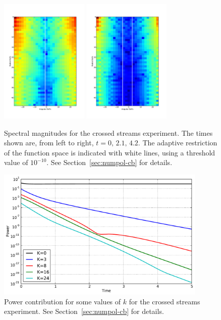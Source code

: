 \begin{figure}
{    \includegraphics[width=4.2cm]{figs/polboltz/scrossed-spec-b2-i1}
    \includegraphics[width=4.2cm]{figs/polboltz/scrossed-spec-b2-i2}
}
\caption{Spectral magnitudes for the crossed streams experiment.  The times shown are, from left to right,
$t=0,\,2.1,\,4.2$.  The adaptive restriction of the function space is indicated with white lines,
using a threshold value of $10^{-10}$. See Section~\vref{sec:numpol-cb} for details.}
\label{fig:numpol-cb-spec}
\end{figure}

\begin{figure}
    \centering
    \includegraphics[width=10cm]{figs/polboltz/power}
    \caption{Power contribution for some values of $k$ for the crossed streams experiment. See
    Section~\vref{sec:numpol-cb} for details.}
    \label{fig:numpol-cb-power}
\end{figure}

